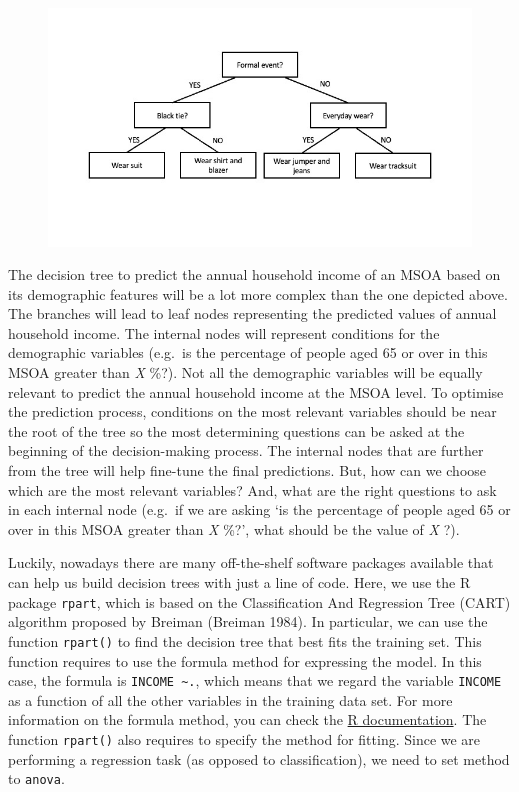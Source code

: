 \documentclass[
  letterpaper,
  DIV=11,
  numbers=noendperiod]{scrreprt}
\begin{document}
\begin{figure}

{\centering \includegraphics[width=4.89583in,height=\textheight]{figs/chp10/Decision tree.jpg}

}

\end{figure}

The decision tree to predict the annual household income of an MSOA
based on its demographic features will be a lot more complex than the
one depicted above. The branches will lead to leaf nodes representing
the predicted values of annual household income. The internal nodes will
represent conditions for the demographic variables (e.g.~is the
percentage of people aged 65 or over in this MSOA greater than \emph{X}
\%?). Not all the demographic variables will be equally relevant to
predict the annual household income at the MSOA level. To optimise the
prediction process, conditions on the most relevant variables should be
near the root of the tree so the most determining questions can be asked
at the beginning of the decision-making process. The internal nodes that
are further from the tree will help fine-tune the final predictions.
But, how can we choose which are the most relevant variables? And, what
are the right questions to ask in each internal node (e.g.~if we are
asking `is the percentage of people aged 65 or over in this MSOA greater
than \emph{X} \%?', what should be the value of \emph{X} ?).

Luckily, nowadays there are many off-the-shelf software packages
available that can help us build decision trees with just a line of
code. Here, we use the R package \texttt{rpart}, which is based on the
Classification And Regression Tree (CART) algorithm proposed by Breiman
(Breiman 1984). In particular, we can use the function \texttt{rpart()}
to find the decision tree that best fits the training set. This function
requires to use the formula method for expressing the model. In this
case, the formula is \texttt{INCOME\ \textasciitilde{}.}, which means
that we regard the variable \texttt{INCOME} as a function of all the
other variables in the training data set. For more information on the
formula method, you can check the
\href{https://www.rdocumentation.org/packages/stats/versions/3.6.2/topics/formula}{R
documentation}. The function \texttt{rpart()} also requires to specify
the method for fitting. Since we are performing a regression task (as
opposed to classification), we need to set method to
\texttt{\textquotesingle{}anova\textquotesingle{}}.
\end{document}

